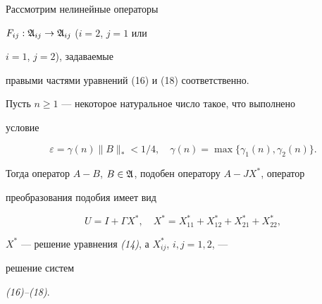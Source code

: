 Рассмотрим нелинейные операторы


$F_{ij}:\frak A_{ij}\to\frak A_{ij}$ ($i=2$, $j=1$ или


$i=1$, $j=2$), задаваемые


правыми частями уравнений (16) и (18) соответственно.





\begin{lem}


Пусть $n\ge 1$ --- некоторое натуральное число такое, что выполнено


условие


\begin{equation}


\varepsilon=\gamma(n)\|B\|_*<1/4,\quad


\gamma(n)=\max\{\gamma_1(n),\gamma_2(n)\}.


\end{equation}


Тогда оператор $A-B$, $B\in\frak A$, подобен оператору $A-JX^*$, оператор


преобразования подобия имеет вид


\begin{equation}


U=I+\Gamma X^*,\quad X^*=X^*_{11}+X^*_{12}+X^*_{21}+X^*_{22},


\end{equation}


$X^*$ --- решение уравнения {\em (14)}, а $X^*_{ij}$, $i,j=1,2$, ---


решение систем


{\em (16)--(18)}.


\end{lem}





